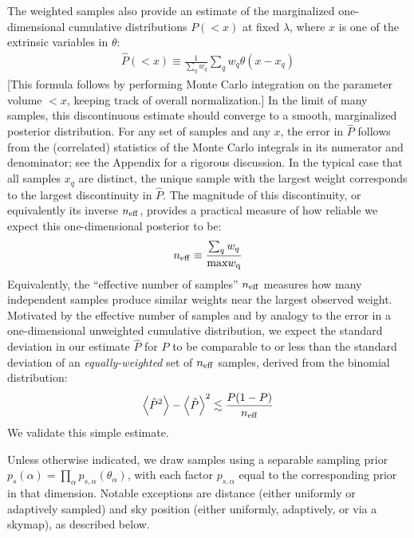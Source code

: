 The weighted samples also provide an estimate of the marginalized one-dimensional cumulative distributions $P(<x)$ at
fixed $\lambda$, where $x$ is one of the extrinsic variables in $\theta$:
\begin{eqnarray}
\hat{P}(<x) \equiv \frac{1}{\sum_q w_q} \sum_q w_q \theta(x-x_q)
\end{eqnarray}
[This formula follows by performing Monte Carlo integration on the parameter volume $<x$, keeping track of overall
  normalization.]  
In the limit of many samples, this discontinuous estimate should converge to a smooth, marginalized posterior
  distribution.  
%
For any set of samples and any $x$, the error in $\hat{P}$ follows from the (correlated) statistics of the Monte Carlo
integrals in its numerator and denominator; see the Appendix for a rigorous discussion. 
In the typical case that all samples $x_q$ are distinct, the unique sample with the largest weight corresponds to the
largest discontinuity in $\hat{P}$.  The magnitude of this discontinuity, or equivalently its inverse $n_{\rm eff}$,
provides a practical measure of how reliable we expect this one-dimensional posterior to be:
\begin{eqnarray}
n_{\rm eff} \equiv \frac{\sum_q w_q}{\text{max} w_{\rm q}}
\end{eqnarray}
Equivalently, the ``effective number of samples'' $n_{\rm eff}$ measures how many independent samples produce similar
weights near the largest observed weight.  
%
Motivated by the effective number of samples and by analogy to the error in a one-dimensional unweighted cumulative
distribution, we expect the standard deviation in our estimate $\hat{P}$ for $P$ to be comparable to or less than the
standard deviation of an \emph{equally-weighted} set of $n_{\rm eff}$ samples,  derived from the binomial distribution:
\begin{eqnarray}
\left<\hat{P}^2\right > - \left<\hat{P} \right>^2 \lesssim \frac{P(1-P)}{n_{\rm eff}}
\end{eqnarray}
We  validate this simple estimate.  


%
Unless otherwise indicated, we draw samples using a separable sampling prior $p_s(\alpha) =
\prod_{\alpha}p_{s,\alpha}(\theta_\alpha)$, with each factor $p_{s,\alpha}$ equal to the corresponding prior in that dimension.  Notable exceptions are
distance (either uniformly or adaptively sampled) and sky position (either uniformly, adaptively, or via a skymap), as
described below.
%

